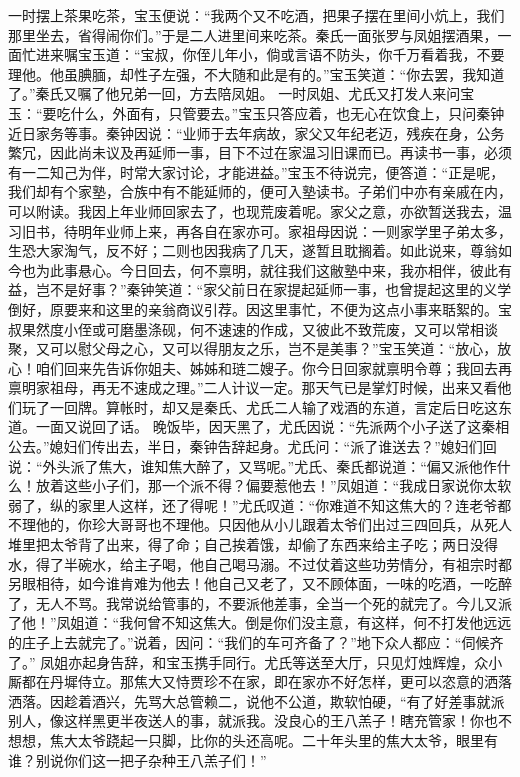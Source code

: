 \documentclass[12pt,oneside]{book}
\begin{document}
一时摆上茶果吃茶，宝玉便说：“我两个又不吃酒，把果子摆在里间小炕上，我们那里坐去，省得闹你们。”于是二人进里间来吃茶。秦氏一面张罗与凤姐摆酒果，一面忙进来嘱宝玉道：“宝叔，你侄儿年小，倘或言语不防头，你千万看着我，不要理他。他虽腆腼，却性子左强，不大随和此是有的。”宝玉笑道：“你去罢，我知道了。”秦氏又嘱了他兄弟一回，方去陪凤姐。
一时凤姐、尤氏又打发人来问宝玉：“要吃什么，外面有，只管要去。”宝玉只答应着，也无心在饮食上，只问秦钟近日家务等事。秦钟因说：“业师于去年病故，家父又年纪老迈，残疾在身，公务繁冗，因此尚未议及再延师一事，目下不过在家温习旧课而已。再读书一事，必须有一二知己为伴，时常大家讨论，才能进益。”宝玉不待说完，便答道：“正是呢，我们却有个家塾，合族中有不能延师的，便可入塾读书。子弟们中亦有亲戚在内，可以附读。我因上年业师回家去了，也现荒废着呢。家父之意，亦欲暂送我去，温习旧书，待明年业师上来，再各自在家亦可。家祖母因说：一则家学里子弟太多，生恐大家淘气，反不好；二则也因我病了几天，遂暂且耽搁着。如此说来，尊翁如今也为此事悬心。今日回去，何不禀明，就往我们这敝塾中来，我亦相伴，彼此有益，岂不是好事？”秦钟笑道：“家父前日在家提起延师一事，也曾提起这里的义学倒好，原要来和这里的亲翁商议引荐。因这里事忙，不便为这点小事来聒絮的。宝叔果然度小侄或可磨墨涤砚，何不速速的作成，又彼此不致荒废，又可以常相谈聚，又可以慰父母之心，又可以得朋友之乐，岂不是美事？”宝玉笑道：“放心，放心！咱们回来先告诉你姐夫、姊姊和琏二嫂子。你今日回家就禀明令尊；我回去再禀明家祖母，再无不速成之理。”二人计议一定。那天气已是掌灯时候，出来又看他们玩了一回牌。算帐时，却又是秦氏、尤氏二人输了戏酒的东道，言定后日吃这东道。一面又说回了话。
晚饭毕，因天黑了，尤氏因说：“先派两个小子送了这秦相公去。”媳妇们传出去，半日，秦钟告辞起身。尤氏问：“派了谁送去？”媳妇们回说：“外头派了焦大，谁知焦大醉了，又骂呢。”尤氏、秦氏都说道：“偏又派他作什么！放着这些小子们，那一个派不得？偏要惹他去！”凤姐道：“我成日家说你太软弱了，纵的家里人这样，还了得呢！”尤氏叹道：“你难道不知这焦大的？连老爷都不理他的，你珍大哥哥也不理他。只因他从小儿跟着太爷们出过三四回兵，从死人堆里把太爷背了出来，得了命；自己挨着饿，却偷了东西来给主子吃；两日没得水，得了半碗水，给主子喝，他自己喝马溺。不过仗着这些功劳情分，有祖宗时都另眼相待，如今谁肯难为他去！他自己又老了，又不顾体面，一味的吃酒，一吃醉了，无人不骂。我常说给管事的，不要派他差事，全当一个死的就完了。今儿又派了他！”凤姐道：“我何曾不知这焦大。倒是你们没主意，有这样，何不打发他远远的庄子上去就完了。”说着，因问：“我们的车可齐备了？”地下众人都应：“伺候齐了。”
凤姐亦起身告辞，和宝玉携手同行。尤氏等送至大厅，只见灯烛辉煌，众小厮都在丹墀侍立。那焦大又恃贾珍不在家，即在家亦不好怎样，更可以恣意的洒落洒落。因趁着酒兴，先骂大总管赖二，说他不公道，欺软怕硬，“有了好差事就派别人，像这样黑更半夜送人的事，就派我。没良心的王八羔子！瞎充管家！你也不想想，焦大太爷跷起一只脚，比你的头还高呢。二十年头里的焦大太爷，眼里有谁？别说你们这一把子杂种王八羔子们！”
\end{document}
